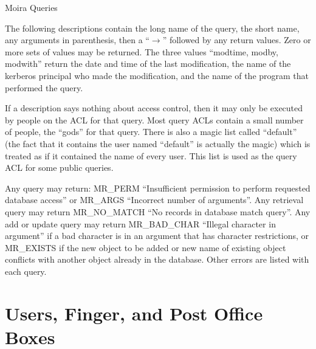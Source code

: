 

\begin{center}
{\Large Moira Queries}
\end{center}

The following descriptions contain the long name of the query, the
short name, any arguments in parenthesis, then a ``$\rightarrow$''
followed by any return values. Zero or more sets of values may be
returned. The three values ``modtime, modby, modwith'' return the date
and time of the last modification, the name of the kerberos principal
who made the modification, and the name of the program that performed
the query.

If a description says nothing about access control, then it may only
be executed by people on the ACL for that query.  Most query ACLs
contain a small number of people, the ``gods'' for that query.  There is
also a magic list called ``default'' (the fact that it contains the user
named ``default'' is actually the magic) which is treated as if it
contained the name of every user.  This list is used as the query ACL
for some public queries.

Any query may return: MR\_PERM ``Insufficient permission to perform
requested database access'' or MR\_ARGS ``Incorrect number of
arguments''.  Any retrieval query may return MR\_NO\_MATCH ``No records
in database match query''.  Any add or update query may return
MR\_BAD\_CHAR ``Illegal character in argument'' if a bad character is in
an argument that has character restrictions, or MR\_EXISTS if the new
object to be added or new name of existing object conflicts with
another object already in the database.  Other errors are listed with
each query.


\section{Users, Finger, and Post Office Boxes}

